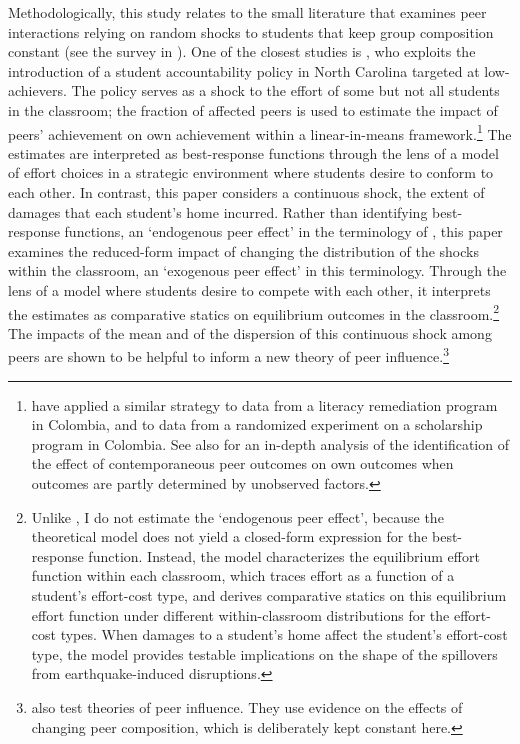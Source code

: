 Methodologically, this study relates to the small literature that examines peer interactions relying on random shocks to students that keep group composition constant (see the survey in \cite{bramoulle2020peer}). One of the closest studies is \cite{fruehwirth2013identifying}, who exploits the introduction of a student accountability policy in North Carolina targeted at low-achievers. The policy serves as a shock to the effort of some but not all students in the classroom; the fraction of affected peers is used to estimate the impact of peers' achievement on own achievement within a linear-in-means framework.\footnote{\cite{berlinski2023helping} have applied a similar strategy to data from a literacy remediation program in Colombia, and \cite{dieye2014accounting} to data from a randomized experiment on a scholarship program in Colombia. See also \cite{fruehwirth2014can} for an in-depth analysis of the identification of the effect of contemporaneous peer outcomes on own outcomes when outcomes are partly determined by unobserved factors.  } The estimates are interpreted as best-response functions through the lens of a model of effort choices in a strategic environment where students desire to conform to each other. In contrast, this paper considers a continuous shock, the extent of damages that each student's home incurred. Rather than identifying best-response functions, an `endogenous peer effect' in the terminology of \cite{manski1993identification}, this paper examines the reduced-form impact of changing the distribution of the shocks within the classroom, an `exogenous peer effect' in this terminology. Through the lens of a model where students desire to compete with each other, it interprets the estimates as comparative statics on equilibrium outcomes in the classroom.\footnote{Unlike \cite{fruehwirth2013identifying}, I do not estimate the `endogenous peer effect', because the theoretical model does not yield a closed-form expression for the best-response function. Instead, the model characterizes the equilibrium effort function within each classroom, which traces effort as a function of a student's effort-cost type, and derives comparative statics on this equilibrium effort function under different within-classroom distributions for the effort-cost types. When damages to a student's home affect the student's effort-cost type, the model provides testable implications on the shape of the spillovers from earthquake-induced disruptions.} The impacts of the mean and of the dispersion of this continuous shock among peers are shown to be helpful to inform a new theory of peer influence.\footnote{\cite{de2013understanding} also test theories of peer influence. They use evidence on the effects of changing peer composition, which is deliberately kept constant here.}\par 

